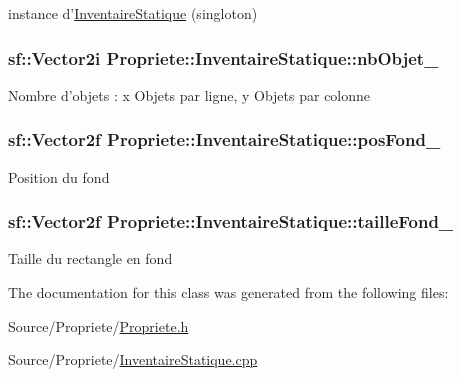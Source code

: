 instance d'\hyperlink{classPropriete_1_1InventaireStatique}{Inventaire\-Statique} (singloton) \hypertarget{classPropriete_1_1InventaireStatique_a39b5442b56892675cd57ebc8d1cabe55}{
\subsubsection[{nb\-Objet\-\_\-}]{\setlength{\rightskip}{0pt plus 5cm}sf\-::\-Vector2i Propriete\-::\-Inventaire\-Statique\-::nb\-Objet\-\_\-\hspace{0.3cm}{\ttfamily [private]}}}\label{classPropriete_1_1InventaireStatique_a39b5442b56892675cd57ebc8d1cabe55}
Nombre d'objets \-: x Objets par ligne, y Objets par colonne \hypertarget{classPropriete_1_1InventaireStatique_aa87cc7023c837e29cec3961912484fe5}{
\subsubsection[{pos\-Fond\-\_\-}]{\setlength{\rightskip}{0pt plus 5cm}sf\-::\-Vector2f Propriete\-::\-Inventaire\-Statique\-::pos\-Fond\-\_\-\hspace{0.3cm}{\ttfamily [private]}}}\label{classPropriete_1_1InventaireStatique_aa87cc7023c837e29cec3961912484fe5}
Position du fond \hypertarget{classPropriete_1_1InventaireStatique_ae3f1b7ce5a1b0027c8015d65bde893b9}{
\subsubsection[{taille\-Fond\-\_\-}]{\setlength{\rightskip}{0pt plus 5cm}sf\-::\-Vector2f Propriete\-::\-Inventaire\-Statique\-::taille\-Fond\-\_\-\hspace{0.3cm}{\ttfamily [private]}}}\label{classPropriete_1_1InventaireStatique_ae3f1b7ce5a1b0027c8015d65bde893b9}
Taille du rectangle en fond 

The documentation for this class was generated from the following files\-:\begin{DoxyCompactItemize}
\item 
Source/\-Propriete/\hyperlink{Propriete_8h}{Propriete.\-h}\item 
Source/\-Propriete/\hyperlink{Propriete_2InventaireStatique_8cpp}{Inventaire\-Statique.\-cpp}\end{DoxyCompactItemize}
